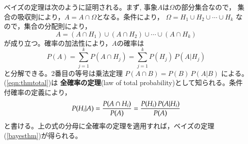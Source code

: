 
ベイズの定理は次のように証明される。まず, 事象$A$は$\Omega$の部分集合なので，
集合の吸収則により，$A= A\cap \Omega$となる。条件により，
$
\Omega = H_1\cup H_2\cup\cdots\cup H_k
$
なので，集合の分配則により，
$$
A = (A\cap H_1)\cup (A\cap H_2) \cup\cdots\cup (A\cap H_k)
$$
が成り立つ。確率の加法性により，$A$の確率は
\begin{equation}
P(A) = \sum_{j=1}^k P(A\cap H_j) = \sum_{j=1}^k P(H_j)\, P(A | H_j)
\label{eqn:thmtotal}
\end{equation}
と分解できる。2番目の等号は乗法定理 $P(A\cap B) = P(B)\, P(A | B)$ による。(\ref{eqn:thmtotal})は
{\bf 全確率の定理}(law of total probability)として知られる。条件付確率の定義により，
$$
P(H_i|A) = {P(A\cap H_i) \over P(A)} = {P(H_i)\, P(A|H_i) \over P(A)} 
$$
と書ける。上の式の分母に全確率の定理を適用すれば，ベイズの定理 (\ref{bayesthm})が得られる。



